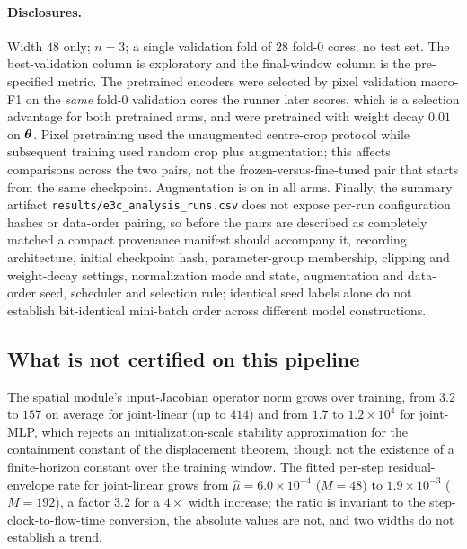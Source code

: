 \paragraph{Disclosures.} Width $48$ only; $n = 3$; a single validation fold of
$28$ fold-0 cores; no test set. The best-validation column is exploratory and
the final-window column is the pre-specified metric. The pretrained encoders
were selected by pixel validation macro-F1 on the \emph{same} fold-0 validation
cores the runner later scores, which is a selection advantage for both
pretrained arms, and were pretrained with weight decay $0.01$ on ${\boldsymbol{\theta}}$.
Pixel pretraining used the unaugmented centre-crop protocol while subsequent
training used random crop plus augmentation; this affects comparisons across
the two pairs, not the frozen-versus-fine-tuned pair that starts from the same
checkpoint. Augmentation is on in all arms. Finally, the summary artifact
\texttt{results/e3c\_analysis\_runs.csv} does not expose per-run configuration
hashes or data-order pairing, so before the pairs are described as completely
matched a compact provenance manifest should accompany it, recording
architecture, initial checkpoint hash, parameter-group membership, clipping and
weight-decay settings, normalization mode and state, augmentation and
data-order seed, scheduler and selection rule; identical seed labels alone do
not establish bit-identical mini-batch order across different model
constructions.

\subsection{What is not certified on this pipeline}
\label{app:prod_scope}

The spatial module's input-Jacobian operator norm grows over training, from
$3.2$ to $157$ on average for joint-linear (up to $414$) and from $1.7$ to
$1.2\times10^{4}$ for joint-MLP, which rejects an initialization-scale
stability approximation for the containment constant of the displacement
theorem, though not the existence of a finite-horizon constant over the
training window. The fitted per-step residual-envelope rate for joint-linear
grows from $\hat\mu = 6.0\times10^{-4}$ ($M = 48$) to $1.9\times10^{-3}$
($M = 192$), a factor $3.2$ for a $4\times$ width increase; the ratio is
invariant to the step-clock-to-flow-time conversion, the absolute values are
not, and two widths do not establish a trend.

